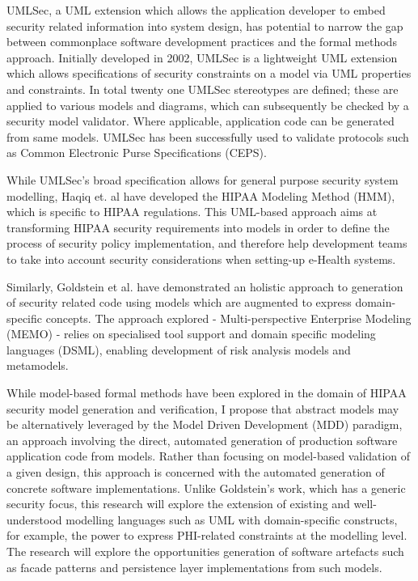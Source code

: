 UMLSec, a UML extension which allows the application developer to embed security related information into system design\cite{RefBest1}, has potential to narrow the gap between commonplace software development practices and the formal methods approach. Initially developed in 2002, UMLSec is a lightweight UML extension which allows specifications of security constraints on a model via UML properties and constraints. In total twenty one UMLSec stereotypes are defined; these are applied to various models and diagrams, which can subsequently be checked by a security model validator. Where applicable, application code can be generated from same models. UMLSec has been successfully used to validate protocols such as Common Electronic Purse Specifications (CEPS)\cite{RefJurgens1}.

While UMLSec's broad specification allows for general purpose security system modelling, Haqiq et. al have developed the HIPAA Modeling Method (HMM), which is specific to HIPAA regulations. This UML-based approach aims at transforming HIPAA security requirements into models in order to define the process of security policy implementation, and therefore help development teams to take into account security considerations when setting-up e-Health systems\cite{RefHaqiq1}.

Similarly, Goldstein et al. have demonstrated an holistic approach to generation of security related code using models which are augmented to express domain-specific concepts\cite{RefGoldstein1}. The approach explored - Multi-perspective Enterprise Modeling (MEMO) - relies on specialised tool support and domain specific modeling languages (DSML), enabling development of risk analysis models and metamodels. 


While model-based formal methods have been explored in the domain of HIPAA security model generation and verification, I propose that abstract models may be alternatively leveraged by the Model Driven Development (MDD) paradigm, an approach involving the direct, automated generation of production software application code from models. Rather than focusing on model-based validation of a given design, this approach is concerned with the automated generation of concrete software implementations. Unlike Goldstein's work\cite{RefGoldstein1}, which has a generic security focus, this research will explore the extension of existing and well-understood modelling languages such as UML with domain-specific constructs, for example, the power to express PHI-related constraints at the modelling level. The research will explore the opportunities generation of software artefacts such as facade patterns and persistence layer implementations from such models. 

